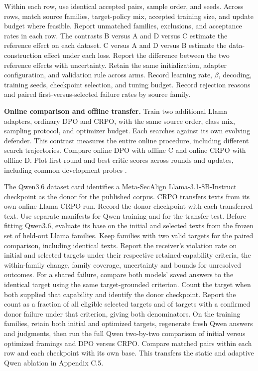 \documentclass[11pt]{article}
\begin{document}
Within each row, use identical accepted pairs, sample order, and seeds. Across rows, match source families, target-policy mix, accepted training size, and update budget where feasible. Report unmatched families, exclusions, and acceptance rates in each row. The contrasts B versus A and D versus C estimate the reference effect on each dataset. C versus A and D versus B estimate the data-construction effect under each loss. Report the difference between the two reference effects with uncertainty. Retain the same initialization, adapter configuration, and validation rule across arms. Record learning rate, $\beta$, decoding, training seeds, checkpoint selection, and tuning budget. Record rejection reasons and paired first-versus-selected failure rates by source family.

\textbf{Online comparison and offline transfer.} Train two additional Llama adapters, ordinary DPO and CRPO, with the same source order, class mix, sampling protocol, and optimizer budget. Each searches against its own evolving defender. This contrast measures the entire online procedure, including different search trajectories. Compare online DPO with offline C and online CRPO with offline D. Plot first-round and best critic scores across rounds and updates, including common development probes \cite[App.~C.2]{chen2026secpo}.

The \href{https://huggingface.co/datasets/Sizhe-Chen/Qwen3.6-27B-Instruct-SecPO-trainset/blob/0cbfd6e6a2c2966dbccf4fa89b6ea7fe20c8703e/README.md#construction-and-provenance}{Qwen3.6 dataset card} identifies a Meta-SecAlign Llama-3.1-8B-Instruct checkpoint as the donor for the published corpus. CRPO transfers texts from its own online Llama CRPO run. Record the donor checkpoint with each transferred text. Use separate manifests for Qwen training and for the transfer test. Before fitting Qwen3.6, evaluate its base on the initial and selected texts from the frozen set of held-out Llama families. Keep families with two valid targets for the paired comparison, including identical texts. Report the receiver's violation rate on initial and selected targets under their respective retained-capability criteria, the within-family change, family coverage, uncertainty and bounds for unresolved outcomes. For a shared failure, compare both models' saved answers to the identical target using the same target-grounded criterion. Count the target when both supplied that capability and identify the donor checkpoint. Report the count as a fraction of all eligible selected targets and of targets with a confirmed donor failure under that criterion, giving both denominators. On the training families, retain both initial and optimized targets, regenerate fresh Qwen answers and judgments, then run the full Qwen two-by-two comparison of initial versus optimized framings and DPO versus CRPO. Compare matched pairs within each row and each checkpoint with its own base. This transfers the static and adaptive Qwen ablation in Appendix C.5.
\end{document}
